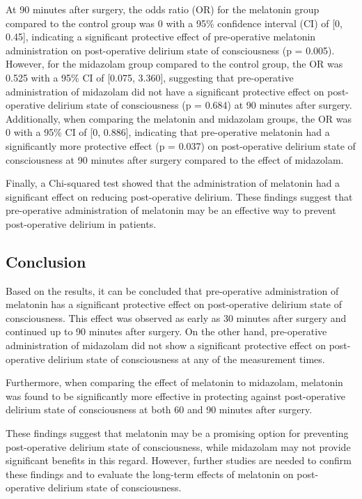 \documentclass[
]{article}
\begin{document}
At 90 minutes after surgery, the odds ratio (OR) for the melatonin group
compared to the control group was 0 with a 95\% confidence interval (CI)
of {[}0, 0.45{]}, indicating a significant protective effect of
pre-operative melatonin administration on post-operative delirium state
of consciousness (p = 0.005). However, for the midazolam group compared
to the control group, the OR was 0.525 with a 95\% CI of {[}0.075,
3.360{]}, suggesting that pre-operative administration of midazolam did
not have a significant protective effect on post-operative delirium
state of consciousness (p = 0.684) at 90 minutes after surgery.
Additionally, when comparing the melatonin and midazolam groups, the OR
was 0 with a 95\% CI of {[}0, 0.886{]}, indicating that pre-operative
melatonin had a significantly more protective effect (p = 0.037) on
post-operative delirium state of consciousness at 90 minutes after
surgery compared to the effect of midazolam.

Finally, a Chi-squared test showed that the administration of melatonin
had a significant effect on reducing post-operative delirium. These
findings suggest that pre-operative administration of melatonin may be
an effective way to prevent post-operative delirium in patients.

\hypertarget{conclusion}{%
\subsection{Conclusion}\label{conclusion}}

Based on the results, it can be concluded that pre-operative
administration of melatonin has a significant protective effect on
post-operative delirium state of consciousness. This effect was observed
as early as 30 minutes after surgery and continued up to 90 minutes
after surgery. On the other hand, pre-operative administration of
midazolam did not show a significant protective effect on post-operative
delirium state of consciousness at any of the measurement times.

Furthermore, when comparing the effect of melatonin to midazolam,
melatonin was found to be significantly more effective in protecting
against post-operative delirium state of consciousness at both 60 and 90
minutes after surgery.

These findings suggest that melatonin may be a promising option for
preventing post-operative delirium state of consciousness, while
midazolam may not provide significant benefits in this regard. However,
further studies are needed to confirm these findings and to evaluate the
long-term effects of melatonin on post-operative delirium state of
consciousness.
\end{document}
